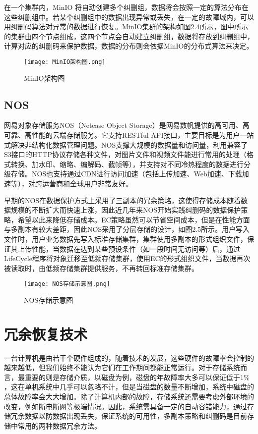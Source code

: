 在一个集群内，MinIO 将自动创建多个纠删组，数据将会按照一定的算法分布在这些纠删组中。若某个纠删组中的数据出现异常或丢失，在一定的故障域内，可以用纠删码算法对异常的数据进行恢复。MinIO集群的架构如图2.4所示，图中所示的集群由四个节点组成，这四个节点会自动建立纠删组，数据将存放到纠删组中，计算对应的纠删码来保护数据，数据的分布则会依据MinIO的分布式算法来决定。

\begin{figure}
    \centering
    \texttt{[image: MinIO架构图.png]}
    \caption{MinIO架构图}
\end{figure}

\subsection{NOS}%
网易对象存储服务NOS（Netease Object Storage）是网易数帆提供的高可用、高可靠、高性能的云端存储服务。它支持RESTful API接口，主要目标是为用户一站式解决非结构化数据管理问题。NOS支撑大规模的数据量和访问量，利用兼容了S3接口的HTTP协议存储各种文件，对图片文件和视频文件能进行常用的处理（格式转换、加水印、缩略、编解码、截帧等），并支持对不同冷热程度的数据进行分级存储。NOS也支持通过CDN进行访问加速（包括上传加速、Web加速、下载加速等），对跨运营商和全球用户非常友好。

早期的NOS在数据保护方式上采用了三副本的冗余策略，这使得存储成本随着数据规模的不断扩大而快速上涨，因此近几年来NOS开始实践纠删码的数据保护策略，希望以此来降低存储成本。EC策略虽然可以节省空间成本，但是在性能方面与多副本有较大差距，因此NOS采用了分层存储的设计，如图2.5所示。用户写入文件时，用户业务数据先写入标准存储集群，集群使用多副本的形式组织文件，保证其上传性能，当数据在达到某些预设条件（如一段时间无访问等）后，通过LifeCycle程序将对象迁移至低频存储集群，使用EC的形式组织文件，当数据再次被读取时，由低频存储集群提供服务，不再转回标准存储集群。

\begin{figure}
    \centering
    \texttt{[image: NOS存储示意图.png]}
    \caption{NOS存储示意图}
\end{figure}

\section{冗余恢复技术}%
一台计算机是由若干个硬件组成的，随着技术的发展，这些硬件的故障率会控制的越来越低，但我们始终不能认为它们在工作期间都能正常运行。对于存储系统而言，最重要的则是存储介质，以磁盘为例，磁盘的年故障率大多可以保证低于1$\%$\cite{38}，这在单机系统中几乎可以忽略不计，但是当磁盘的数量不断增加，系统中磁盘的总体故障率会大大增加。除了计算机内部的故障，存储系统还需要考虑外部环境的改变，例如断电断网等极端情况。因此，系统需具备一定的自动容错能力，通过存储冗余数据以防数据出现丢失，保证系统的可用性，多副本\cite{39}策略和纠删码\cite{40}是目前存储中常用的两种数据冗余方法。

